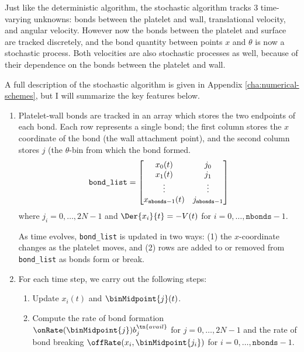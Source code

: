 Just like the deterministic algorithm, the stochastic algorithm tracks
3 time-varying unknowns: bonds between the platelet and wall,
translational velocity, and angular velocity. However now the bonds
between the platelet and surface are tracked discretely, and the bond
quantity between points $x$ and $\theta$ is now a stochastic
process. Both velocities are also stochastic processes as well,
because of their dependence on the bonds between the platelet and
wall.

A full description of the stochastic algorithm is given in Appendix
\ref{cha:numerical-schemes}, but I will summarize the key features
below.
\begin{enumerate}
\item Platelet-wall bonds are tracked in an array which stores the two
  endpoints of each bond. Each row represents a single bond; the first
  column stores the $x$ coordinate of the bond (the wall attachment
  point), and the second column stores $j$ (the $\theta$-bin from which
  the bond formed.
  \begin{equation}
    \label{eq:bond-list}
    \verb|bond_list| =
    \begin{bmatrix}
      x_0(t) & j_0 \\
      x_1(t) & j_1 \\
      \vdots & \vdots \\
      x_{\texttt{nbonds}-1}(t) & j_{\texttt{nbonds} - 1}
    \end{bmatrix}    
  \end{equation}
  where $j_i = 0, \hdots, 2N-1$ and $\Der{x_i}{t} = -V(t)$ for $i = 0,
  \hdots, \texttt{nbonds} - 1$.

  As time evolves, \verb|bond_list| is updated in two ways: (1) the
  $x$-coordinate changes as the platelet moves, and (2) rows are added
  to or removed from \verb|bond_list| as bonds form or break.

\item For each time step, we carry out the following steps:
  \begin{enumerate}
  \item Update $x_i(t)$ and $\binMidpoint{j}(t)$.
  \item Compute the rate of bond formation $\onRate(\binMidpoint{j})
    b_j^\tn{avail}$ for $j = 0, \hdots, 2N-1$ and the rate of bond
    breaking $\offRate(x_i, \binMidpoint{j_i})$ for $i = 0, \hdots,
    \texttt{nbonds} - 1$.
  \end{enumerate}
\end{enumerate}
